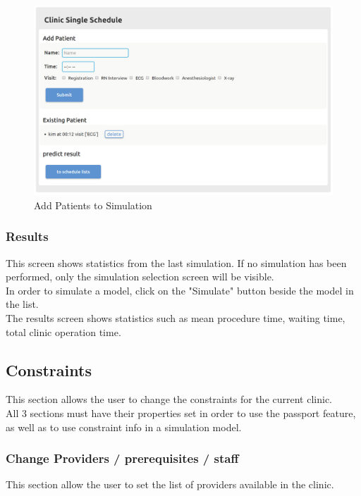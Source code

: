 \documentclass[12pt]{article}
\begin{document}
\begin{figure}[H]
\centering
\includegraphics[width=\textwidth]{sim}
\caption{Add Patients to Simulation}
\end{figure}

\subsubsection{Results}
This screen shows statistics from the last simulation. If no simulation has been performed, only the simulation selection screen will be visible.\\

In order to simulate a model, click on the "Simulate" button beside the model in the list.\\

The results screen shows statistics such as mean procedure time, waiting time, total clinic operation time. \\

\subsection{Constraints}
This section allows the user to change the constraints for the current clinic.\\

All 3 sections must have their properties set in order to use the passport feature, as well as to use constraint info in a simulation model.\\

\subsubsection{Change Providers / prerequisites / staff}
This section allow the user to set the list of providers available in the clinic.\\
\end{document}

